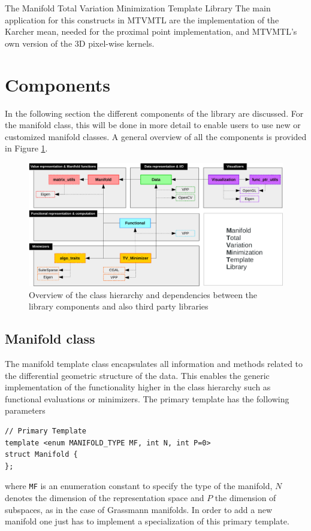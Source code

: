 \begin{chapter}{The Manifold Total Variation Minimization Template Library}
The main application for this constructs in MTVMTL are the implementation of the Karcher mean, needed for the proximal point implementation, and MTVMTL's own version
of the 3D pixel-wise kernels.


\section{Components} %
\label{sec:Components}
In the following section the different components of the library are discussed. For the manifold class, this will be done in more detail to enable users to use new or customized manifold classes. A general overview of all the components is provided in Figure \ref{fig:components}.
\begin{figure}[h!]
        \centering
	    \includegraphics[width=1.0\linewidth]{./figures/library/components.pdf}
	\caption[Overview of library components]{Overview of the class hierarchy and dependencies between the library components and also third party libraries
	}
	\label{fig:components}
\end{figure}

\subsection{Manifold class} %
\label{sub:Manifold classes}
The manifold template class encapsulates all information and methods related to the differential geometric structure of the data. 
This enables the generic implementation of the functionality higher in the class hierarchy such as functional evaluations or minimizers.
The primary template has the following parameters
\cppinline
\begin{lstlisting}
// Primary Template
template <enum MANIFOLD_TYPE MF, int N, int P=0>
struct Manifold {
}; 
\end{lstlisting}
where \texttt{MF} is an enumeration constant to specify the type of the manifold, $N$ denotes the dimension of the representation space and $P$ the dimension of subspaces,
as in the case of Grassmann manifolds. In order to add a new manifold one just has to implement a specialization of this primary template.\\


\end{chapter}
